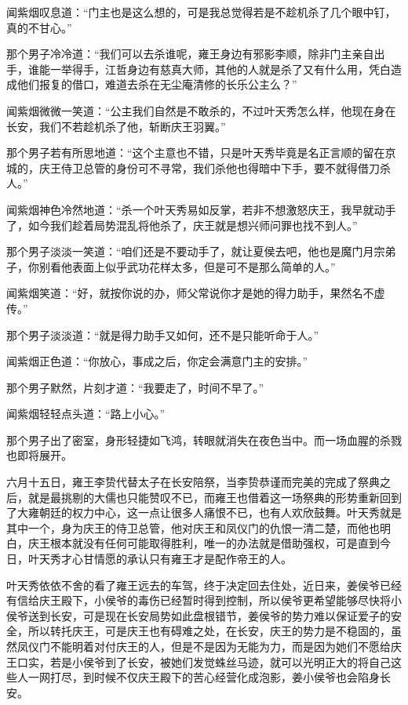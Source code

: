 闻紫烟叹息道：“门主也是这么想的，可是我总觉得若是不趁机杀了几个眼中钉，真的不甘心。”

那个男子冷冷道：“我们可以去杀谁呢，雍王身边有邪影李顺，除非门主亲自出手，谁能一举得手，江哲身边有慈真大师，其他的人就是杀了又有什么用，凭白造成他们报复的借口，难道去杀在无尘庵清修的长乐公主么？”

闻紫烟微微一笑道：“公主我们自然是不敢杀的，不过叶天秀怎么样，他现在身在长安，我们不若趁机杀了他，斩断庆王羽翼。”

那个男子若有所思地道：“这个主意也不错，只是叶天秀毕竟是名正言顺的留在京城的，庆王侍卫总管的身份可不寻常，我们杀他也得暗中下手，要不就得借刀杀人。”

闻紫烟神色冷然地道：“杀一个叶天秀易如反掌，若非不想激怒庆王，我早就动手了，如今我们趁着局势混乱将他杀了，庆王就是想兴师问罪也找不到人。”

那个男子淡淡一笑道：“咱们还是不要动手了，就让夏侯去吧，他也是魔门月宗弟子，你别看他表面上似乎武功花样太多，但是可不是那么简单的人。”

闻紫烟笑道：“好，就按你说的办，师父常说你才是她的得力助手，果然名不虚传。”

那个男子淡淡道：“就是得力助手又如何，还不是只能听命于人。”

闻紫烟正色道：“你放心，事成之后，你定会满意门主的安排。”

那个男子默然，片刻才道：“我要走了，时间不早了。”

闻紫烟轻轻点头道：“路上小心。”

那个男子出了密室，身形轻捷如飞鸿，转眼就消失在夜色当中。而一场血腥的杀戮也即将展开。

六月十五日，雍王李贽代替太子在长安陪祭，当李贽恭谨而完美的完成了祭典之后，就是最挑剔的大儒也只能赞叹不已，而雍王也借着这一场祭典的形势重新回到了大雍朝廷的权力中心，这一点让很多人痛恨不已，也有人欢欣鼓舞。叶天秀就是其中一个，身为庆王的侍卫总管，他对庆王和凤仪门的仇恨一清二楚，而他也明白，庆王根本就没有任何可能取得胜利，唯一的办法就是借助强权，可是直到今日，叶天秀才心甘情愿的承认只有雍王才是配作帝王的人。

叶天秀依依不舍的看了雍王远去的车驾，终于决定回去住处，近日来，姜侯爷已经有信给庆王殿下，小侯爷的毒伤已经暂时得到控制，所以侯爷更希望能够尽快将小侯爷送到长安，可是现在长安局势如此盘根错节，姜侯爷的势力难以保证爱子的安全，所以转托庆王，可是庆王也有碍难之处，在长安，庆王的势力是不稳固的，虽然凤仪门不能明着对付庆王的人，但是不是因为无能为力，而是因为她们不愿给庆王口实，若是小侯爷到了长安，被她们发觉蛛丝马迹，就可以光明正大的将自己这些人一网打尽，到时候不仅庆王殿下的苦心经营化成泡影，姜小侯爷也会陷身长安。

